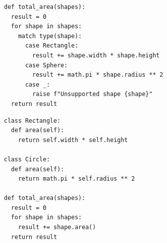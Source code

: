 \documentclass[calcdimensions,landscape,letterpaper]{powersem}
\newcommand{\thecurrentheading}{}
\newcommand{\heading}[1]{\renewcommand{\thecurrentheading}{#1}}
\begin{document}
\begin{slide}
  \heading{Open-Closed - Before}
  \begin{center}
    \begin{verbatim}
def total_area(shapes):
  result = 0
  for shape in shapes:
    match type(shape):
      case Rectangle:
        result += shape.width * shape.height
      case Sphere:
        result += math.pi * shape.radius ** 2
      case _:
        raise f"Unsupported shape {shape}"
  return result
    \end{verbatim}
  \end{center}
\end{slide}

\begin{slide}
  \heading{Open-Closed - After}
  \begin{center}
    \begin{verbatim}
class Rectangle:
  def area(self):
    return self.width * self.height

class Circle:
  def area(self):
    return math.pi * self.radius ** 2

def total_area(shapes):
  result = 0
  for shape in shapes:
    result += shape.area()
  return result
    \end{verbatim}
  \end{center}
\end{slide}
\end{document}
